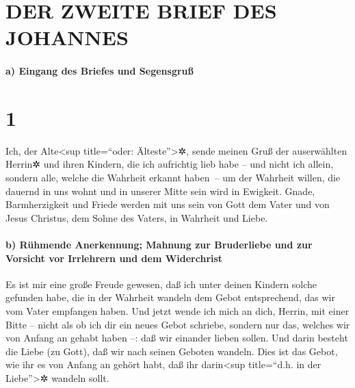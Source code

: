 \hypertarget{der-zweite-brief-des-johannes}{%
\section{DER ZWEITE BRIEF DES
JOHANNES}\label{der-zweite-brief-des-johannes}}

\hypertarget{a-eingang-des-briefes-und-segensgruuxdf}{%
\paragraph{a) Eingang des Briefes und
Segensgruß}\label{a-eingang-des-briefes-und-segensgruuxdf}}

\hypertarget{section}{%
\section{1}\label{section}}

 Ich, der Alte\textless sup title=``oder:
Älteste''\textgreater✲, sende meinen Gruß der auserwählten Herrin✲ und
ihren Kindern, die ich aufrichtig lieb habe -- und nicht ich allein,
sondern alle, welche die Wahrheit erkannt haben~--  um der
Wahrheit willen, die dauernd in uns wohnt und in unserer Mitte sein wird
in Ewigkeit.  Gnade, Barmherzigkeit und Friede werden mit
uns sein von Gott dem Vater und von Jesus Christus, dem Sohne des
Vaters, in Wahrheit und Liebe.

\hypertarget{b-ruxfchmende-anerkennung-mahnung-zur-bruderliebe-und-zur-vorsicht-vor-irrlehrern-und-dem-widerchrist}{%
\paragraph{b) Rühmende Anerkennung; Mahnung zur Bruderliebe und zur
Vorsicht vor Irrlehrern und dem
Widerchrist}\label{b-ruxfchmende-anerkennung-mahnung-zur-bruderliebe-und-zur-vorsicht-vor-irrlehrern-und-dem-widerchrist}}

 Es ist mir eine große Freude gewesen, daß ich unter
deinen Kindern solche gefunden habe, die in der Wahrheit wandeln dem
Gebot entsprechend, das wir vom Vater empfangen haben. 
Und jetzt wende ich mich an dich, Herrin, mit einer Bitte -- nicht als
ob ich dir ein neues Gebot schriebe, sondern nur das, welches wir von
Anfang an gehabt haben --: daß wir einander lieben sollen.
 Und darin besteht die Liebe (zu Gott), daß wir nach
seinen Geboten wandeln. Dies ist das Gebot, wie ihr es von Anfang an
gehört habt, daß ihr darin\textless sup title=``d.h. in der
Liebe''\textgreater✲ wandeln sollt.

